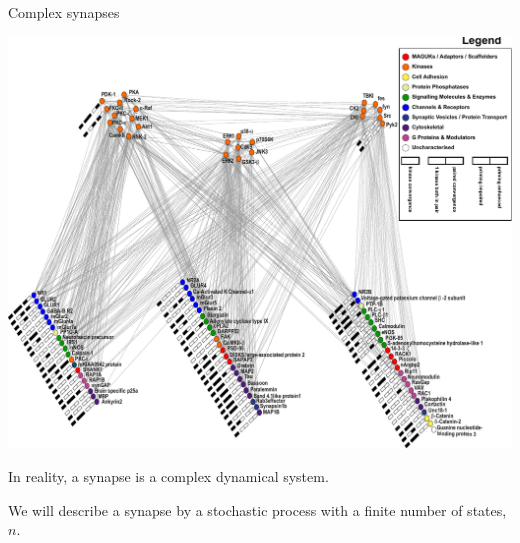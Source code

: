 \documentclass[final,hyperref={pdfpagelabels=false,bookmarks=false}]{beamer}
\newcommand{\citerr}[1]{\hfill {\footnotesize{\color{darkgrey}\cite{#1}}}}
\begin{document}
\begin{frame}{}
\begin{columns}[t]
\begin{column}{0.27\linewidth}
\begin{block}{Complex synapses}
%
 \begin{minipage}[b]{16cm}
 \includegraphics[width=15cm]{2000102CobaFig4.pdf}

 \citerr{Coba2009phosphorylation}
\end{minipage}
 \begin{minipage}[b]{10cm}
 In reality, a synapse is a complex dynamical system.

 \vp We will describe a synapse by a stochastic process with a finite number of states, $n$.


\end{minipage}
\end{block}
\end{column}
\end{columns}
\end{frame}
\end{document}
